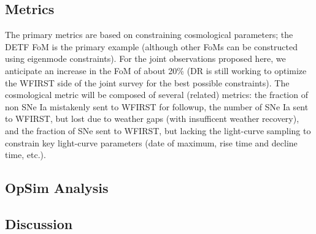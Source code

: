 
\subsection{Metrics}
\label{sec:\secname:metrics}


The primary metrics are based on constraining cosmological parameters; the DETF FoM is the primary example (although other FoMs can be constructed using eigenmode constraints). For the joint observations proposed here, we anticipate an increase in the FoM of about 20\% (DR is still working to optimize the WFIRST side of the joint survey for the best possible constraints). The cosmological metric will be composed of several (related) metrics: the fraction of non SNe Ia mistakenly sent to WFIRST for followup, the number of SNe Ia sent to WFIRST, but lost due to weather gaps (with insufficent weather recovery), and the fraction of SNe sent to WFIRST, but lacking the light-curve sampling to constrain key light-curve parameters (date of maximum, rise time and decline time, etc.). 


\subsection{OpSim Analysis}
\label{sec:\secname:analysis}




\subsection{Discussion}
\label{sec:\secname:discussion}




\navigationbar
